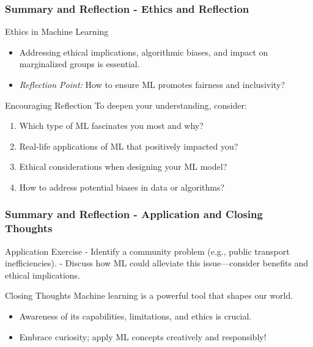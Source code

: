\documentclass[aspectratio=169]{beamer}
\begin{document}
\begin{frame}[fragile]
  \frametitle{Summary and Reflection - Ethics and Reflection}
  
  \begin{block}{Ethics in Machine Learning}
    \begin{itemize}
      \item Addressing ethical implications, algorithmic biases, and impact on marginalized groups is essential.
      \item \textit{Reflection Point:} How to ensure ML promotes fairness and inclusivity?
    \end{itemize}
  \end{block}
  
  \begin{block}{Encouraging Reflection}
    To deepen your understanding, consider:
    \begin{enumerate}
      \item Which type of ML fascinates you most and why?
      \item Real-life applications of ML that positively impacted you?
      \item Ethical considerations when designing your ML model?
      \item How to address potential biases in data or algorithms?
    \end{enumerate}
  \end{block}
\end{frame}

\begin{frame}[fragile]
  \frametitle{Summary and Reflection - Application and Closing Thoughts}

  \begin{block}{Application Exercise}
    - Identify a community problem (e.g., public transport inefficiencies).
    - Discuss how ML could alleviate this issue—consider benefits and ethical implications.
  \end{block}
  
  \begin{block}{Closing Thoughts}
    Machine learning is a powerful tool that shapes our world. 
    \begin{itemize}
      \item Awareness of its capabilities, limitations, and ethics is crucial.
      \item Embrace curiosity; apply ML concepts creatively and responsibly!
    \end{itemize}
  \end{block}
\end{frame}
\end{document}
